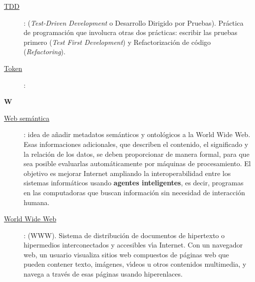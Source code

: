\begin{description}
  \item[\underline{TDD}\label{apend1:tdd}]: (\textit{Test-Driven Development} o Desarrollo Dirigido por Pruebas). Pr\'actica de programaci\'on que involucra otras dos pr\'acticas: escribir las 
  pruebas primero (\textit{Test First Development}) y Refactorizaci\'on de c\'odigo (\textit{Refactoring}).
  \bigskip
\end{description}

\begin{description}
  \item[\underline{Token}\label{apend1:token}]:
  \bigskip
\end{description}

\bigskip
{\bfseries {\Huge W}}\label{Apendice1:W}
\bigskip
\bigskip

\begin{description}
  \item[\underline{Web sem\'antica}\label{apend1:web}]: idea de a\~{n}adir metadatos sem\'anticos y ontol\'ogicos a la World Wide Web. Esas informaciones adicionales, que describen el contenido, 
  el significado y la relaci\'on de los datos, se deben proporcionar de manera formal, para que sea posible evaluarlas autom\'aticamente por m\'aquinas de procesamiento. El objetivo es mejorar 
  Internet ampliando la interoperabilidad entre los sistemas inform\'aticos usando {\bfseries agentes inteligentes}, es decir, programas en las computadoras que buscan informaci\'on sin necesidad de 
  interacci\'on humana.
  \bigskip
\end{description}

\begin{description}
  \item[\underline{World Wide Web}\label{apend1:www}]: (WWW). Sistema de distribuci\'on de documentos de hipertexto o hipermedios interconectados y accesibles v\'{\i}a Internet. Con un navegador 
  web, un usuario visualiza sitios web compuestos de p\'aginas web que pueden contener texto, im\'agenes, v\'{\i}deos u otros contenidos multimedia, y navega a trav\'es de esas p\'aginas usando 
hiperenlaces.
  \bigskip
\end{description}